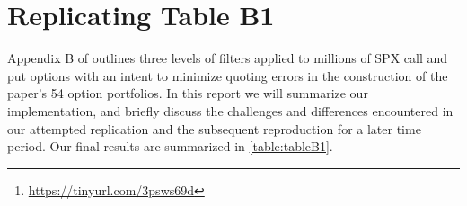 \begin{titlepage}

% 
\maketitle


\doublespacing
\begin{abstract}
In this report we summarize our efforts to replicate the Appendix B data filtration process described in \textit{The Puzzle of Index Option Returns} by \citet{constantinides2013}. These filters shape the underlying distribution of implied volatility (``IV'') and moneyness for a large cross-section of SPX index options (1 million+), and were used to build and price 54 option portfolios in the paper. Due to the unavailability of SPX option data from 1985 to 1995, we focus our analysis on replicating the filtration results using data from \STARTONE\ to \ENDONE. We then apply these filters to more recent data from \STARTTWO\ to \ENDTWO. We show that the paper's results are challenging to replicate as described, and also that elegant results obtained from intricately constructed data filters are not always reproducible in other periods. The implications for option pricing models based on time-fragile data filters would be an interesting follow-up study. Our analysis and code can be readily found on \href{https://tinyurl.com/3psws69d}{Github}\footnote{ \url{https://tinyurl.com/3psws69d}}.  


\end{abstract}


\end{titlepage}

\doublespacing


\section{Replicating Table B1}

Appendix B of \citet{constantinides2013} outlines three levels of filters applied to millions of SPX call and put options with an intent to minimize quoting errors in the construction of the paper's 54 option portfolios. In this report we will summarize our implementation, and briefly discuss the challenges and differences encountered in our attempted replication and the subsequent reproduction for a later time period. Our final results are summarized in \autoref{table:tableB1}. 
\newpage

